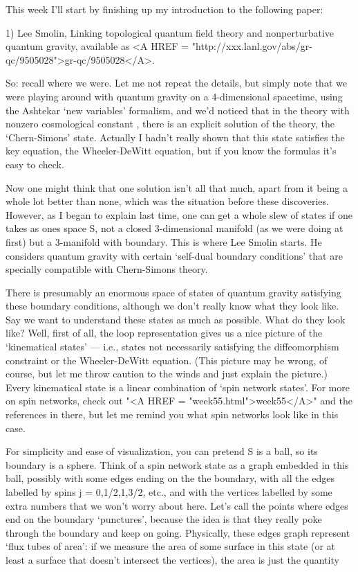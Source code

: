 

This week I'll start by finishing up my introduction to
the following paper:

1) Lee Smolin, Linking topological quantum field theory and 
nonperturbative quantum gravity, available as <A HREF = "http://xxx.lanl.gov/abs/gr-qc/9505028">gr-qc/9505028</A>.

So: recall where we were.  Let me not repeat the details, but
simply note that we were playing around with quantum gravity
on a 4-dimensional spacetime, using the Ashtekar `new variables'
formalism, and we'd noticed that in the theory with nonzero cosmological 
constant \Lambda , there is an explicit solution of the theory, 
the `Chern-Simons' state.  Actually I hadn't really shown that this
state satisfies the key equation, the Wheeler-DeWitt equation, but if you
know the formulas it's easy to check. 

Now one might think that one solution isn't all that much, apart from
it being a whole lot better than none, which was the situation before
these discoveries.  However, as I began to explain last time, one can get
a whole slew of states if one takes as ones space S, not a closed 3-dimensional 
manifold (as we were doing at first) but a 3-manifold with boundary.  
This is where Lee Smolin starts.  He considers quantum gravity with
certain `self-dual boundary conditions' that are specially compatible with 
Chern-Simons theory.   

There is presumably an enormous space of states of quantum gravity 
satisfying these boundary conditions, although we don't really know what 
they look like.  Say we want to understand these states as much as possible. 
What do they look like?  Well, first of all, the loop representation gives us a 
nice picture of the `kinematical states' --- i.e., states not 
necessarily satisfying the diffeomorphism constraint or 
the Wheeler-DeWitt equation.  (This picture may be wrong, of course, 
but let me throw caution to the winds and just explain the picture.)  
Every kinematical state is a linear combination of `spin network states'.  
For more on spin networks, check out "<A HREF = "week55.html">week55</A>" and the references in there,
but let me remind you what spin networks look like in this case.

For simplicity and ease of visualization, you can pretend S is a ball, 
so its boundary is a sphere.  Think of a spin network state as a 
graph embedded in this ball, possibly with some edges ending on the 
the boundary, with all the edges labelled by spins j = 0,1/2,1,3/2, etc., and 
with the vertices labelled by some extra numbers that we won't worry 
about here.  Let's call the points where edges end on the 
boundary `punctures', because the idea is that they really poke through 
the boundary and keep on going.    Physically, these edges 
graph represent `flux tubes of area': if we measure the area of some surface
in this state (or at least a surface that doesn't intersect the vertices), 
the area is just the quantity


